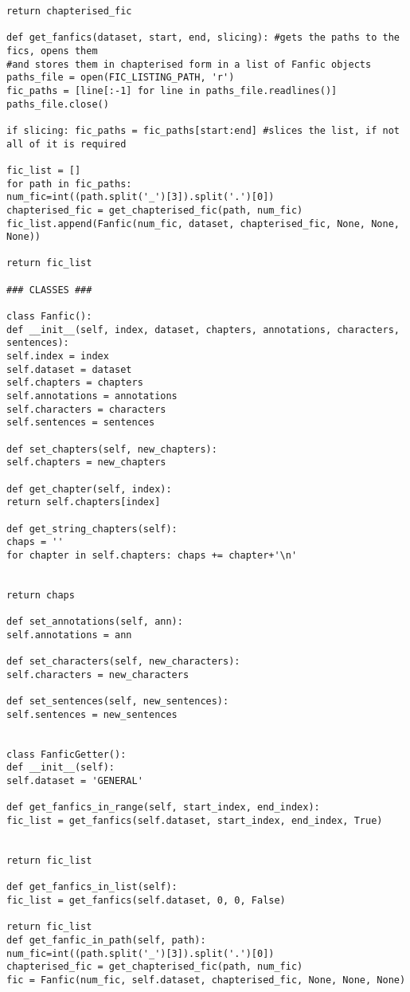 \documentclass{pre-tfg}
\begin{document}
\begin{lstlisting}[style=consola]
return chapterised_fic

def get_fanfics(dataset, start, end, slicing): #gets the paths to the fics, opens them
#and stores them in chapterised form in a list of Fanfic objects
paths_file = open(FIC_LISTING_PATH, 'r')
fic_paths = [line[:-1] for line in paths_file.readlines()]
paths_file.close()

if slicing: fic_paths = fic_paths[start:end] #slices the list, if not all of it is required

fic_list = []
for path in fic_paths:
num_fic=int((path.split('_')[3]).split('.')[0])
chapterised_fic = get_chapterised_fic(path, num_fic)
fic_list.append(Fanfic(num_fic, dataset, chapterised_fic, None, None, None))

return fic_list

### CLASSES ###

class Fanfic():
def __init__(self, index, dataset, chapters, annotations, characters, sentences):
self.index = index
self.dataset = dataset
self.chapters = chapters
self.annotations = annotations
self.characters = characters
self.sentences = sentences

def set_chapters(self, new_chapters):
self.chapters = new_chapters

def get_chapter(self, index):
return self.chapters[index]

def get_string_chapters(self):
chaps = ''
for chapter in self.chapters: chaps += chapter+'\n'


return chaps

def set_annotations(self, ann):
self.annotations = ann

def set_characters(self, new_characters):
self.characters = new_characters

def set_sentences(self, new_sentences):
self.sentences = new_sentences


class FanficGetter():
def __init__(self):
self.dataset = 'GENERAL'

def get_fanfics_in_range(self, start_index, end_index):
fic_list = get_fanfics(self.dataset, start_index, end_index, True)


return fic_list

def get_fanfics_in_list(self):
fic_list = get_fanfics(self.dataset, 0, 0, False)

return fic_list
def get_fanfic_in_path(self, path):
num_fic=int((path.split('_')[3]).split('.')[0])
chapterised_fic = get_chapterised_fic(path, num_fic)
fic = Fanfic(num_fic, self.dataset, chapterised_fic, None, None, None)


\end{lstlisting}
\end{document}
